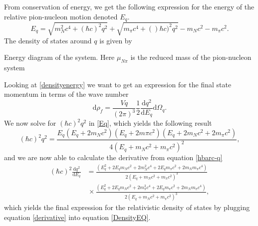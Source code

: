 From conservation of energy, we get the following expression for the energy of the relative pion-nucleon motion denoted $E_q$. 
\begin{equation} \label{Eq}
	E_q = \sqrt{m_N^2 c^4+(\hbar c)^2q^2} + \sqrt{m_\pi c^4+()\hbar c)^2 q^2}-m_N c^2-m_\pi c^2.
\end{equation}
The density of states around $q$ is given by
\begin{marginfigure}
	\centering
	
	\caption{Energy diagram of the system. Here $\mu_{N\pi}$ is the reduced mass of the pion-nucleon system}
	\label{fig:qenergy}
\end{marginfigure}
Looking at \eqref{densityenergy} we want to get an expression for the final state momentum in terms of the wave number
\begin{equation} \label{DensityEQ}
	\text{d}\rho_f = \frac{Vq}{(2\pi)^3}\frac{1}{2}\frac{\text{d}q^2}{\text{d}E_q} \text{d}\Omega_q.
\end{equation}
We now solve for $(\hbar c)^2q^2$ in \ref{Eq}, which yields the following result
\begin{equation} \label{hbarc-q}
	(\hbar c)^2 q^2 = \frac{E_q(E_q+2m_N c^2)(E_q+2m\pi c^2)(E_q+2m_N c^2+2m_\pi c^2)}{4(E_q+m_N c^2+m_\pi c^2)^2},
\end{equation}
and we are now able to calculate the derivative from equation \eqref{hbarc-q}
\begin{equation}\begin{split} \label{derivative}
		(\hbar c)^2\frac{\text{d}q^2}{\text{d}E_q} &= \frac{(E_q^2+2E_q m_N c^2+2m_N^2 c^4+2E_q m_\pi c^2+2m_N m_\pi c^4)}{2(E_q+m_N c^2+m_\pi c^2)^3} \\
		& \, \times \frac{(E_q^2+2E_q m_N c^2 +2m_\pi^2 c^4 +2E_q m_\pi c^2+2m_N m_\pi c^4)}{2(E_q+m_N c^2+m_\pi c^2)^3},
	\end{split}
\end{equation} 
which yields the final expression for the relativistic density of states by plugging equation \eqref{derivative} into equation \eqref{DensityEQ}.
